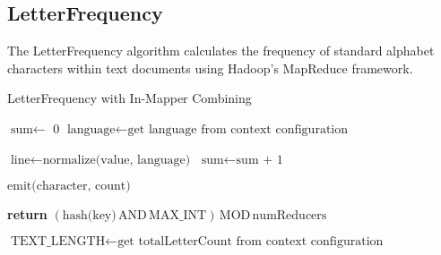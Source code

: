 \newpage
\subsection{LetterFrequency}
The LetterFrequency algorithm calculates the frequency of standard alphabet characters within text documents using Hadoop's MapReduce framework.

\begin{algorithm}
    \caption{LetterFrequency with In-Mapper Combining}
    
    \begin{algorithmic}[1]
        \State $\text{sum} \gets$ 0 
        \State $\text{language} \gets \text{get language from context configuration}$

        \EndProcedure
    
        \Statex
        \State $\text{line} \gets \text{normalize(value, language)}$ 
            \State $\text{sum} \gets \text{sum + 1}$
        \EndFor
        \EndProcedure
    
        \Statex
        
            \State $\text{emit(character, count)}$
        \EndFor
        \EndProcedure
    \EndClass
    \end{algorithmic}
    
    \vspace{0.5cm}  %

    \begin{algorithmic}[1]
        \State \textbf{return} $\left(\text{hash(key)} \, \text{AND} \, \text{MAX\_INT}\right) \, \text{MOD} \, \text{numReducers}$
    \EndProcedure
        \EndClass
    \end{algorithmic}
    
    \vspace{0.5cm}

    \begin{algorithmic}[1]
        \State $\text{TEXT\_LENGTH} \gets \text{get totalLetterCount from context configuration}$


\end{algorithmic}
\end{algorithm}
